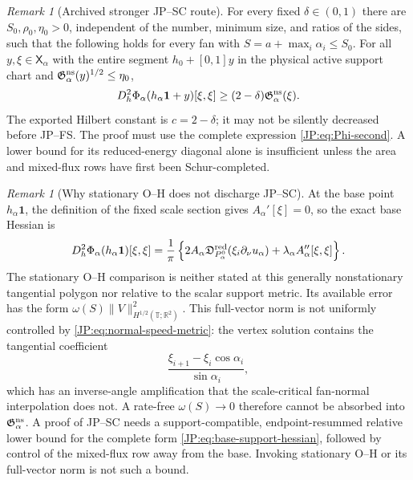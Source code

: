 \documentclass[11pt]{amsart}
\numberwithin{equation}{section}
\theoremstyle{definition}
\theoremstyle{remark}
\newtheorem{remark}[theorem]{Remark}
\newcommand{\Dred}{\mathfrak D^{\rm red}}
\begin{document}
\begin{remark}[Archived stronger JP--SC route]
\label{JP:rem:SC}
For every fixed $\delta\in(0,1)$ there are
$S_0,\rho_0,\eta_0>0$, independent of the number, minimum size, and ratios
of the sides, such that the following holds for every fan with
$S=a+\max_i\alpha_i\le S_0$.  For all
$y,\xi\in\mathsf X_\alpha$ with the
entire segment $h_0+[0,1]y$ in the physical active support chart and
$\mathfrak G_\alpha^{\rm ns}(y)^{1/2}\le\eta_0$,
\begin{equation}\label{JP:eq:SC}
 D_h^2\Phi_\alpha(h_\alpha\mathbf1+y)[\xi,\xi]
 \ge (2-\delta)\mathfrak G_\alpha^{\rm ns}(\xi).
\end{equation}
The exported Hilbert constant is $c=2-\delta$; it may not be silently
decreased before JP--FS.
The proof must use the complete expression \eqref{JP:eq:Phi-second}.  A lower
bound for its reduced-energy diagonal alone is insufficient unless the
area and mixed-flux rows have first been Schur-completed.
\end{remark}

\begin{remark}[Why stationary O--H does not discharge JP--SC]
At the base point $h_\alpha\mathbf1$, the definition of the fixed scale
section gives $A_\alpha'[\xi]=0$, so the exact base Hessian is
\begin{equation}\label{JP:eq:base-support-hessian}
 D_h^2\Phi_\alpha(h_\alpha\mathbf1)[\xi,\xi]
 =\frac1\pi\left\{
 2A_\alpha\Dred_{P_\alpha^0}(\xi_i\partial_\nu u_\alpha)
 +\lambda_\alpha A_\alpha''[\xi,\xi]\right\}.
\end{equation}
The stationary O--H comparison is neither stated at this generally
nonstationary tangential polygon nor relative to the scalar support metric.
Its available error has the form
$\omega(S)\|V\|_{H^{1/2}(\mathbb T;\mathbb R^2)}^2$.  This full-vector
norm is not uniformly controlled by \eqref{JP:eq:normal-speed-metric}: the
vertex solution contains the tangential coefficient
\[
 \frac{\xi_{i+1}-\xi_i\cos\alpha_i}{\sin\alpha_i},
\]
which has an inverse-angle amplification that the scale-critical
fan-normal interpolation does not.  A rate-free $\omega(S)\to0$ therefore
cannot be absorbed into $\mathfrak G_\alpha^{\rm ns}$.  A proof of JP--SC
needs a support-compatible,
endpoint-resummed relative lower bound for the complete form
\eqref{JP:eq:base-support-hessian}, followed by control of the mixed-flux row
away from the base.  Invoking stationary O--H or its full-vector norm is
not such a bound.
\end{remark}
\end{document}
